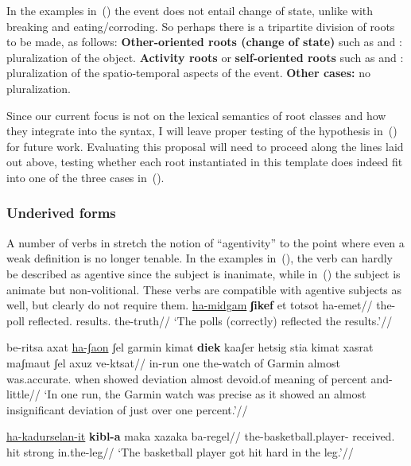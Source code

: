 {In the examples in~(\lastx) the event does not entail change of state, unlike with breaking and eating/corroding. So perhaps there is a tripartite division of roots to be made, as follows:
\pex
	\a \textbf{Other-oriented roots (change of state)} such as  and : pluralization of the object.
	\a \textbf{Activity roots} or \textbf{self-oriented roots} such as  and : pluralization of the spatio-temporal aspects of the event.
	\a \textbf{Other cases:} no pluralization.
\xe

Since our current focus is not on the lexical semantics of root classes and how they integrate into the syntax, I will leave proper testing of the hypothesis in~(\lastx) for future work. Evaluating this proposal will need to proceed along the lines laid out above, testing whether each root instantiated in this template does indeed fit into one of the three cases in~(\lastx).

		\subsubsection{Underived forms} \label{voice:va:sem:underived}
A number of verbs in {\tpie} stretch the notion of ``agentivity'' to the point where even a weak definition is no longer tenable. In the examples in~(\nextx), the verb can hardly be described as agentive since the subject is inanimate, while in~(\anextx) the subject is animate but non-volitional. These verbs are compatible with agentive subjects as well, but clearly do not require them.
\pex
  \a \begingl
    \gla \underline{ha-midgam} \textbf{ʃikef} et totsot ha-emet//
    \glb the-poll reflected.  results. the-truth//
    \glft `The polls (correctly) reflected the results.'//
  \endgl
    
  \a \begingl
    \gla be-ritsa axat \underline{ha-ʃaon} ʃel garmin kimat \textbf{diek} kaaʃer hetsig stia kimat xasrat maʃmaut ʃel axuz ve-ktsat//
    \glb in-run one the-watch of Garmin almost was.accurate. when showed deviation almost devoid.of meaning of percent and-little//
    \glft `In one run, the Garmin watch was precise as it showed an almost insignificant deviation of just over one percent.'//
  \endgl
\xe

\ex \begingl
  \gla \underline{ha-kadurselan-it} \textbf{kibl-a} maka xazaka ba-regel//
  \glb the-basketball.player- received. hit strong in.the-leg//
  \glft `The basketball player got hit hard in the leg.'//
  \endgl
\xe

}
